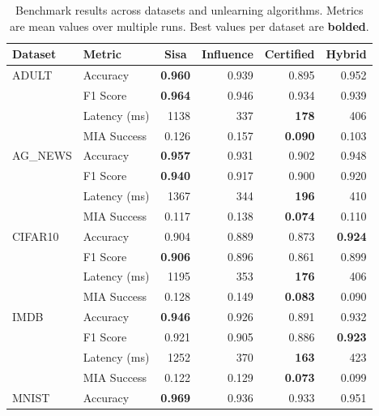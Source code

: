 %
%
% 


\begin{table}[t]
\centering
\caption{Benchmark results across datasets and unlearning algorithms. Metrics are mean values over multiple runs. Best values per dataset are \textbf{bolded}.}
\label{tab:main_results}
\small
\setlength{\tabcolsep}{4pt}
\begin{tabular}{llrrrr}
\toprule
Dataset & Metric & \multicolumn{1}{c}{Sisa} & \multicolumn{1}{c}{Influence} & \multicolumn{1}{c}{Certified} & \multicolumn{1}{c}{Hybrid} \\
\midrule
ADULT & Accuracy & \textbf{0.960} & 0.939 & 0.895 & 0.952 \\
 & F1 Score & \textbf{0.964} & 0.946 & 0.934 & 0.939 \\
 & Latency (ms) & 1138 & 337 & \textbf{178} & 406 \\
 & MIA Success & 0.126 & 0.157 & \textbf{0.090} & 0.103 \\
\midrule
AG\_NEWS & Accuracy & \textbf{0.957} & 0.931 & 0.902 & 0.948 \\
 & F1 Score & \textbf{0.940} & 0.917 & 0.900 & 0.920 \\
 & Latency (ms) & 1367 & 344 & \textbf{196} & 410 \\
 & MIA Success & 0.117 & 0.138 & \textbf{0.074} & 0.110 \\
\midrule
CIFAR10 & Accuracy & 0.904 & 0.889 & 0.873 & \textbf{0.924} \\
 & F1 Score & \textbf{0.906} & 0.896 & 0.861 & 0.899 \\
 & Latency (ms) & 1195 & 353 & \textbf{176} & 406 \\
 & MIA Success & 0.128 & 0.149 & \textbf{0.083} & 0.090 \\
\midrule
IMDB & Accuracy & \textbf{0.946} & 0.926 & 0.891 & 0.932 \\
 & F1 Score & 0.921 & 0.905 & 0.886 & \textbf{0.923} \\
 & Latency (ms) & 1252 & 370 & \textbf{163} & 423 \\
 & MIA Success & 0.122 & 0.129 & \textbf{0.073} & 0.099 \\
\midrule
MNIST & Accuracy & \textbf{0.969} & 0.936 & 0.933 & 0.951 \\

\end{tabular}
\end{table}
